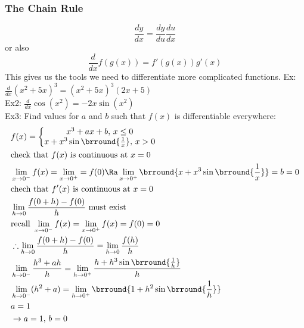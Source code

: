 \subsubsection{The Chain Rule}
$$\frac{dy}{dx}=\frac{dy}{du}\frac{du}{dx}$$ or also $$\frac{d}{dx}f(g(x))=f'(g(x))g'(x)$$
This gives us the tools we need to differentiate more complicated functions.
Ex: $\frac{d}{dx}(x^2+5x)^3=(x^2+5x)^3(2x+5)$\\
Ex2: $\frac{d}{dx}\cos(x^2)=-2x\sin(x^2)$\\
Ex3: Find values for $a$ and $b$ such that $f(x)$ is differentiable everywhere:
\begin{align*}
    &f(x)=\left\{\begin{matrix}
    x^3+ax+b,\,x\leq 0\\
    x+x^3\sin\brround{\frac{1}{x}}
    ,\,x>0\end{matrix}\right.\\
    &\text{check that $f(x)$ is continuous at $x=0$}\\
    &\lim_{x\to0^-}f(x)=\lim_{x\to0^+}=f(0)\Ra\lim_{x\to 0^+}\brround{x+x^3\sin\brround{\frac{1}{x}}}=b=0\\
    &\text{chech that $f'(x)$ is continuous at $x=0$}\\
    &\lim_{h\to 0}\frac{f(0+h)-f(0)}{h}\text{ must exist}\\
    &\text{recall }\lim_{x\to 0^-}f(x)=\lim_{x\to0^+}f(x)=f(0)=0\\
    &\therefore \lim_{h\to 0}\frac{f(0+h)-f(0)}{h}=\lim_{h\to0}\frac{f(h)}{h}\\
    &\lim_{h\to 0^-}\frac{h^3+ah}{h}=\lim_{h\to 0^+}\frac{h+h^3\sin\brround{\frac{1}{h}}}{h}\\
    &\lim_{h\to0^-}(h^2+a)=\lim_{h\to0^+}\brround{1+h^2\sin\brround{\frac{1}{h}}}\\
    &a=1\\
    &\to a=1,\,b=0
\end{align*}